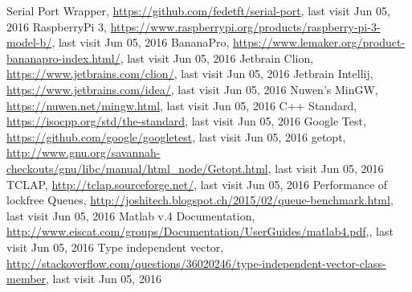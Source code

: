 \begin{thebibliography}{99}
Serial Port Wrapper, \url{https://github.com/fedetft/serial-port}, last visit Jun 05, 2016
RaspberryPi 3, \url{https://www.raspberrypi.org/products/raspberry-pi-3-model-b/}, last visit Jun 05, 2016
BananaPro, \url{https://www.lemaker.org/product-bananapro-index.html/}, last visit Jun 05, 2016
Jetbrain Clion, \url{https://www.jetbrains.com/clion/}, last visit Jun 05, 2016
 Jetbrain Intellij, \url{https://www.jetbrains.com/idea/}, last visit Jun 05, 2016
Nuwen's MinGW, \url{https://nuwen.net/mingw.html}, last visit Jun 05, 2016
C++ Standard, \url{https://isocpp.org/std/the-standard}, last visit Jun 05, 2016
Google Test, \url{https://github.com/google/googletest}, last visit Jun 05, 2016
getopt, \url{http://www.gnu.org/savannah-checkouts/gnu/libc/manual/html_node/Getopt.html}, last visit Jun 05, 2016
TCLAP, \url{http://tclap.sourceforge.net/}, last visit Jun 05, 2016
 Performance of lockfree Queues, \url{http://joshitech.blogspot.ch/2015/02/queue-benchmark.html}, last visit Jun 05, 2016
 Matlab v.4 Documentation, \url{http://www.eiscat.com/groups/Documentation/UserGuides/matlab4.pdf},, last visit Jun 05, 2016
 Type independent vector, \url{http://stackoverflow.com/questions/36020246/type-independent-vector-class-member}, last visit Jun 05, 2016

\end{thebibliography}

